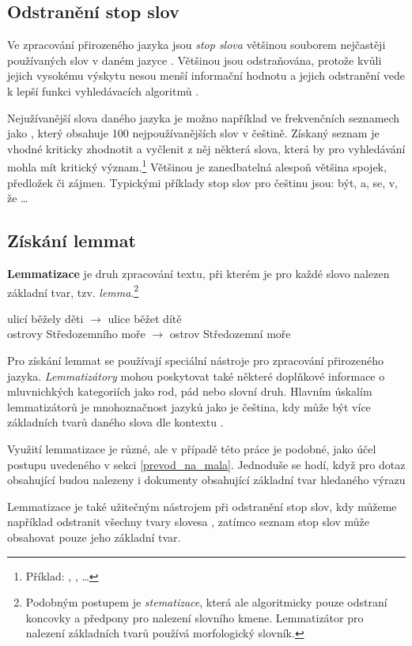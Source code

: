 \subsection{Odstranění stop slov}
\label{stopwords}
Ve zpracování přirozeného jazyka jsou \emph{stop slova} většinou souborem nejčastěji používaných slov v daném jazyce \cite{wiki:stopwords}. Většinou jsou odstraňována, protože kvůli jejich vysokému výskytu nesou menší informační hodnotu a jejich odstranění vede k lepší funkci vyhledávacích algoritmů \cite{bm25_improvements}.\par
Nejužívanější slova daného jazyka je možno například ve frekvenčních seznamech jako \cite{wiki:frekvencni_seznam}, který obsahuje 100 nejpoužívanějších slov v češtině. Získaný seznam je vhodné kriticky zhodnotit a vyčlenit z něj některá slova, která by pro vyhledávání mohla mít kritický význam.\footnote{Příklad: , ,  \dots} Většinou je zanedbatelná alespoň většina spojek, předložek či zájmen. Typickými příklady stop slov pro češtinu jsou: být, a, se, v, že \dots

\subsection{Získání lemmat}
\textbf{Lemmatizace} je druh zpracování textu, při kterém je pro každé slovo nalezen základní tvar, tzv. \emph{lemma}.\footnote{Podobným postupem je \emph{stematizace}, která ale algoritmicky pouze odstraní koncovky a předpony pro nalezení slovního kmene. Lemmatizátor pro nalezení základních tvarů používá morfologický slovník.}
\begin{center}
    ulicí běžely děti $\longrightarrow$ ulice běžet dítě\\
    ostrovy Středozemního moře $\longrightarrow$ ostrov Středozemní moře
\end{center}
Pro získání lemmat se používají speciální nástroje pro zpracování přirozeného jazyka. \emph{Lemma\-tizátory} mohou poskytovat také některé doplňkové informace o mluvnichkých kategoriích jako rod, pád nebo slovní druh. Hlavním úskalím lemmatizátorů je mnohoznačnost jazyků jako je čeština, kdy může být více základních tvarů daného slova dle kontextu \cite{wiki:lemmatizator}.\par
Využití lemmatizace je různé, ale v případě této práce je podobné, jako účel postupu uvedeného v sekci \ref{prevod_na_mala}. Jednoduše se hodí, když pro dotaz obsahující  budou nalezeny i dokumenty obsahující základní tvar hledaného výrazu \par
Lemmatizace je také užitečným nástrojem při odstranění stop slov, kdy můžeme například odstranit všechny tvary slovesa , zatímco seznam stop slov může obsahovat pouze jeho základní tvar.


